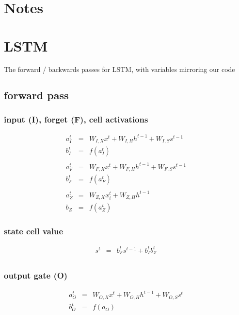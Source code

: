 \documentclass{article}
\begin{document}
\section{Notes}

\section{LSTM}
The forward / backwards passes for LSTM, with variables mirroring our code

\subsection{forward pass}

\subsubsection{input (I), forget (F), cell activations}

\begin{eqnarray*}
a_{I}^t &=& W_{I,X}x^t + W_{I,H}h^{t-1}+W_{I,S}s^{t-1} \\
b_{I}^t &=& f(a_{I}^t) \\
\\
a_{F}^t &=& W_{F, X}x^t + W_{F, H}h^{t-1}+W_{F, S}s^{t-1} \\
b_{F}^t &=& f(a_{F}^t) \\
\\
a_{Z}^t &=& W_{Z,X}x_i^t + W_{Z,H} h^{t-1} \\
b_{Z} &=& f(a_{Z}^t) 
\end{eqnarray*}

\subsubsection{state cell value}
\begin{eqnarray*}
s^t &=& b_{F}^ts^{t-1} + b_{I}^t b_Z^t \\  
\end{eqnarray*}

\subsubsection{output gate (O)}
\begin{eqnarray*}
a_{O}^t &=& W_{O,X}x^t + W_{O,H}h^{t-1} + W_{O,S}s^t \\
b_{O}^t &=& f(a_{O}) \\
\end{eqnarray*}
\end{document}
